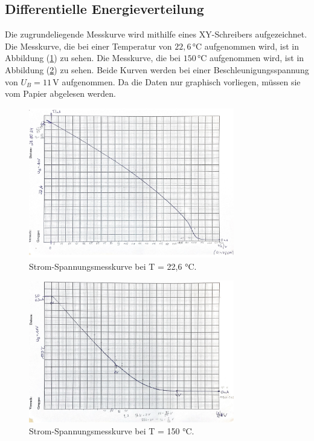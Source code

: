 \subsection{Differentielle Energieverteilung}
Die zugrundeliegende Messkurve wird mithilfe eines 
XY-Schreibers  aufgezeichnet. Die Messkurve, die bei einer 
Temperatur von $22,6 \, °\text{C}$ aufgenommen wird, ist 
in Abbildung (\ref{fig:22,6}) zu sehen. Die Messkurve, die bei 
$150 \, °\text{C}$ aufgenommen wird, ist in Abbildung 
(\ref{fig:150}) zu sehen. Beide Kurven werden bei einer
Beschleunigungsspannung von $U_B = 11 \, \unit{\volt}$
aufgenommen. Da die Daten nur graphisch vorliegen, 
müssen sie vom Papier abgelesen werden. 
\begin{figure}[H]
    \centering
    \includegraphics[width=0.8\textwidth]{content/Bilder/22,6.jpeg}
    \caption{Strom-Spannungsmesskurve bei T = 22,6 °C.}
    \label{fig:22,6}
\end{figure}
\begin{figure}[H]
    \centering
    \includegraphics[width=0.8\textwidth]{content/Bilder/150.jpeg}
    \caption{Strom-Spannungsmesskurve bei T = 150 °C.}
    \label{fig:150}
\end{figure}
